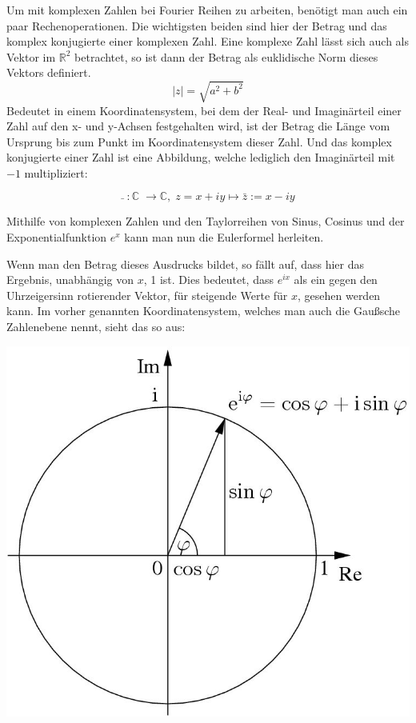 \documentclass[a4paper,12pt]{article}
\begin{document}
Um mit komplexen Zahlen bei Fourier Reihen zu arbeiten, benötigt man auch ein paar Rechenoperationen. Die wichtigsten beiden sind hier der Betrag und das komplex konjugierte einer komplexen Zahl. Eine komplexe Zahl lässt sich auch als Vektor im $\mathbb{R}^2$ betrachtet, so ist dann der Betrag als euklidische Norm dieses Vektors definiert. 
$$\vert{z}\vert = \sqrt{ a^2 + b^2}$$
Bedeutet in einem Koordinatensystem, bei dem der Real- und Imaginärteil einer Zahl auf den x- und y-Achsen festgehalten wird, ist der Betrag die Länge vom Ursprung bis zum Punkt im Koordinatensystem dieser Zahl. 
Und das komplex konjugierte einer Zahl ist eine Abbildung, welche lediglich den Imaginärteil mit $-1$ multipliziert:

$$\bar{}\;:\mathbb{C}\;\to\mathbb{C},\; z = x+iy \mapsto \bar{z} := x-iy$$

Mithilfe von komplexen Zahlen und den Taylorreihen von Sinus, Cosinus und der Exponentialfunktion $e^x$ kann man nun die Eulerformel herleiten. 


Wenn man den Betrag dieses Ausdrucks bildet, so fällt auf, dass hier das Ergebnis, unabhängig von $x$, 1 ist. Dies bedeutet, dass $e^{ix}$ als ein gegen den Uhrzeigersinn rotierender Vektor, für steigende Werte für $x$, gesehen werden kann. Im vorher genannten Koordinatensystem, welches man auch die Gaußsche Zahlenebene nennt, sieht das so aus:
\begin{center}
\includegraphics[scale=0.75]{eulerformel.jpg}
\end{center}
\end{document}
